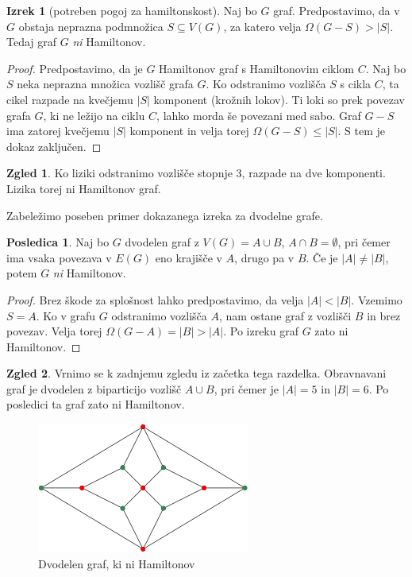 \documentclass[11pt]{book}
\theoremstyle{definition}
\theoremstyle{zgled}
\newtheorem*{zgled}{Zgled}
\theoremstyle{odprtproblem}
\theoremstyle{domacanaloga}
\newenvironment{dokaz}
    {\color{siva}\begin{proof}}
    {\end{proof}}
\theoremstyle{izrek}
\newtheorem*{izrek}{Izrek}
\newtheorem*{posledica}{Posledica}
\begin{document}
\begin{izrek}[potreben pogoj za hamiltonskost]
Naj bo $G$ graf. Predpostavimo, da v $G$ obstaja neprazna podmnožica $S \subseteq V(G)$, za katero velja $\Omega(G-S) > |S|$. Tedaj graf $G$ \emph{ni} Hamiltonov.
\end{izrek}
\begin{dokaz}
Predpostavimo, da je $G$ Hamiltonov graf s Hamiltonovim ciklom $C$. Naj bo $S$ neka neprazna množica vozlišč grafa $G$. Ko odstranimo vozlišča $S$ s cikla $C$, ta cikel razpade na kvečjemu $|S|$ komponent (krožnih lokov). Ti loki so prek povezav grafa $G$, ki ne ležijo na ciklu $C$, lahko morda še povezani med sabo. Graf $G - S$ ima zatorej kvečjemu $|S|$ komponent in velja torej $\Omega(G - S) \leq |S|$. S tem je dokaz zaključen.
\end{dokaz}

\begin{zgled}
Ko liziki odstranimo vozlišče stopnje $3$, razpade na dve komponenti. Lizika torej ni Hamiltonov graf.
\end{zgled}

Zabeležimo poseben primer dokazanega izreka za dvodelne grafe.

\begin{posledica}
Naj bo $G$ dvodelen graf z $V(G) = A \cup B$, $A \cap B = \emptyset$, pri čemer ima vsaka povezava v $E(G)$ eno krajišče v $A$, drugo pa v $B$. Če je $|A| \neq |B|$, potem $G$ \emph{ni} Hamiltonov.
\end{posledica}
\begin{dokaz}
    Brez škode za splošnost lahko predpostavimo, da velja $|A| < |B|$. Vzemimo $S = A$. Ko v grafu $G$ odstranimo vozlišča $A$, nam ostane graf z vozlišči $B$ in brez povezav. Velja torej $\Omega(G-A) = |B| > |A|$. Po izreku graf $G$ zato ni Hamiltonov.
\end{dokaz}

\begin{zgled}
Vrnimo se k zadnjemu zgledu iz začetka tega razdelka. Obravnavani graf je dvodelen z biparticijo vozlišč $A \cup B$, pri čemer je $|A| = 5$ in $|B| = 6$. Po posledici ta graf zato ni Hamiltonov.

\begin{figure}[h]
    \centering
    \includegraphics[width=0.5\linewidth]{img/grafi-hamilton-zgled-dvodelen.png}
    \caption{Dvodelen graf, ki ni Hamiltonov}
\end{figure}  
\end{zgled}
\end{document}
